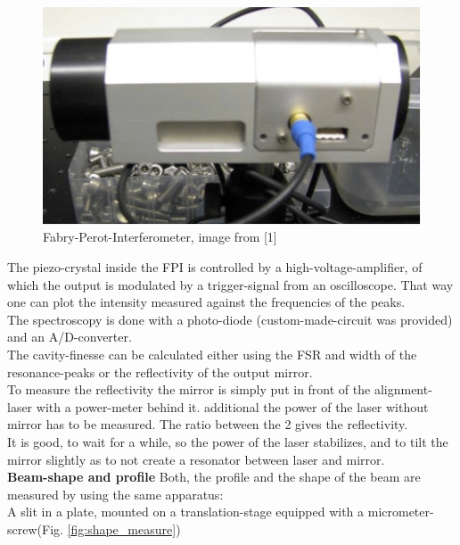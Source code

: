 \documentclass[12pt,a4paper]{article}
\begin{document}
\begin{multicols}{2}
\begin{figure}[H]
 \centering
 \includegraphics[scale=0.9]{./figures/FPI.png}
 \caption{Fabry-Perot-Interferometer, image from [1]}
 \label{fig:FPI}
\end{figure}

\noindent The piezo-crystal inside the FPI is controlled by a high-voltage-amplifier, of which the output is modulated by a trigger-signal from an oscilloscope. That way one can plot the intensity measured against the frequencies of the peaks.\\
The spectroscopy is done with a photo-diode (custom-made-circuit was provided) and an A/D-converter.\\

\noindent The cavity-finesse can be calculated either using the FSR and width of the resonance-peaks or 
the reflectivity of the output mirror.\\
To measure the reflectivity the mirror is simply put in front of the alignment-laser with a power-meter behind it. additional the power of the laser without mirror has to be measured. The ratio between the 2 gives the reflectivity.\\
It is good, to wait for a while, so the power of the laser stabilizes, and to tilt the mirror slightly as to not create a resonator between laser and mirror.\\

\noindent \textbf{Beam-shape and profile}
Both, the profile and the shape of the beam are measured by using the same apparatus:\\
A slit in a plate, mounted on a translation-stage equipped with a micrometer-screw(Fig. \ref{fig:shape_measure})


\end{multicols}
\end{document}
